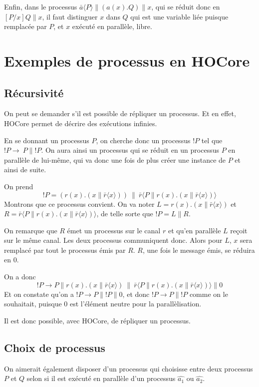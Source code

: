 \documentclass[11pt]{article}
\begin{document}
Enfin, dans le processus $\bar{a}\langle P\rangle\|(a(x).Q)\|x$,  qui se réduit donc en $[P/x]Q\|x$, il faut distinguer $x$ dans $Q$ qui est une variable liée puisque remplacée par $P$, et $x$ exécuté en parallèle, libre. 



\section{Exemples de processus en HOCore}
\subsection{Récursivité}

On peut se demander s'il est possible de répliquer un processus. Et en effet, HOCore permet de décrire des exécutions infinies.

En se donnant un processus $P$, on cherche donc un processus $!P$ tel que $!P\rightarrow\ P\|!P$. On aura ainsi un processus qui se réduit en un processus $P$ en parallèle de lui-même, qui va donc une fois de plus créer une instance de $P$ et ainsi de suite.

On prend $$!P = (r(x).(x\|\bar{r}\langle x\rangle))\ \|\ \bar{r}\langle P\|r(x).(x\|\bar{r}\langle x\rangle)\rangle$$
Montrons que ce processus convient. On va noter $L = r(x).(x\|\bar{r}\langle x\rangle)$ et $R = \bar{r}\langle P\|r(x).(x\|\bar{r}\langle x\rangle)\rangle$, de telle sorte que $!P = L\|R$.

On remarque que $R$ émet un processus sur le canal $r$ et qu'en parallèle $L$ reçoit sur le même canal. Les deux processus communiquent donc. Alors pour $L$, $x$ sera remplacé par tout le processus émis par $R$. $R$, une fois le message émis, se réduira en $0$.

On a donc $$!P\rightarrow P\|r(x).(x\|\bar{r}\langle x\rangle)\ \|\ \bar{r}\langle P\|r(x).(x\|\bar{r}\langle x\rangle)\rangle\| 0$$
Et on constate qu'on a $!P\rightarrow P\|!P\|0$, et donc $!P\rightarrow P\|!P$ comme on le souhaitait, puisque $0$ est l'élément neutre pour la parallèlisation.

Il est donc possible, avec HOCore, de répliquer un processus.

\subsection{Choix de processus}
On aimerait également disposer d'un processus qui choisisse entre deux processus $P$ et $Q$ selon si il est exécuté en parallèle d'un processus $\hat{a_1}$ ou $\hat{a_2}$.
\end{document}
